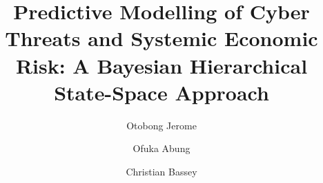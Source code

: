 \documentclass[review]{elsarticle}
\begin{document}
\begin{frontmatter}










\title{Predictive Modelling of Cyber Threats and Systemic Economic Risk: A Bayesian Hierarchical State-Space Approach}

\author[label1]{Otobong Jerome}

\author[label2]{Ofuka Abung}

\author[label3]{Christian Bassey}


\end{frontmatter}
\end{document}
